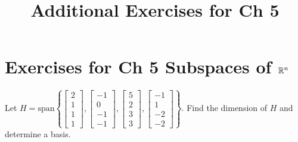 \documentclass{ximera}
\title{Additional Exercises for Ch 5} \license{CC BY-NC-SA 4.0}
\begin{document}
\begin{abstract}
\end{abstract}
\maketitle

\section*{Exercises for Ch 5 Subspaces of $\mathbb{R}^n$}

\begin{problem}\label{prb:5.1} Let $H = \mbox{span}\left\{ \left[
\begin{array}{r}
2 \\
1 \\
1 \\
1
\end{array}
\right] ,\left[
\begin{array}{r}
-1 \\
0 \\
-1 \\
-1
\end{array}
\right] ,\left[
\begin{array}{r}
5 \\
2 \\
3 \\
3
\end{array}
\right] ,\left[
\begin{array}{r}
-1 \\
1 \\
-2 \\
-2
\end{array}
\right] \right\} .$ Find the dimension of $H$ and determine a basis.
\end{problem}
\end{document}
